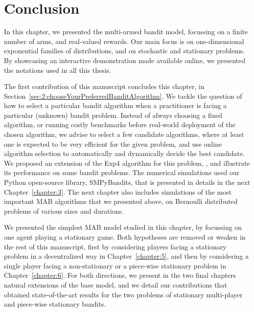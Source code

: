 \newpage  %

\section{Conclusion}
\label{sec:2:conclusion}

In this chapter, we presented the multi-armed bandit model, focussing on a finite number of arms, and real-valued rewards.
Our main focus is on one-dimensional exponential families of distributions, and on stochastic and stationary problems.
By showcasing an interactive demonstration made available online,
we presented the notations used in all this thesis.

The first contribution of this manuscript concludes this chapter, in Section~\ref{sec:2:chooseYourPreferredBanditAlgorithm}.
We tackle the question of how to select a particular bandit algorithm when a practitioner is facing a particular (unknown) bandit problem.
Instead of always choosing a fixed algorithm, or running costly benchmarks before real-world deployment of the chosen algorithm, we advise to select a few candidate algorithms, where at least one is expected to be very efficient for the given problem, and use online algorithm selection to automatically and dynamically decide the best candidate.
We proposed an extension of the Exp4 algorithm for this problem, \Aggr, and illustrate its performance on some bandit problems.
%
The numerical simulations used our Python open-source library, SMPyBandits, that is presented in details in the next Chapter~\ref{chapter:3}.
The next chapter also includes simulations of the most important MAB algorithms that we presented above, on Bernoulli distributed problems of various sizes and durations.

We presented the simplest MAB model studied in this chapter, by focussing on one agent playing a stationary game.
Both hypotheses are removed or weaken in the rest of this manuscript,
first by considering players facing a stationary problem in a decentralized way in Chapter~\ref{chapter:5},
and then by considering a single player facing a non-stationary or a piece-wise stationary problem in Chapter~\ref{chapter:6}.
%
For both directions, we present in the two final chapters natural extensions of the base model, and we detail our contributions that obtained state-of-the-art results for the two problems
of stationary multi-player and piece-wise stationary bandits.

